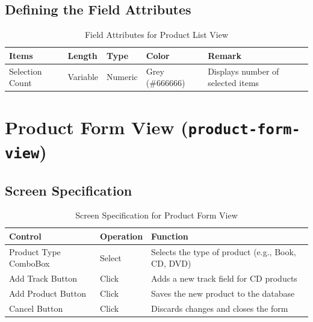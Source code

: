 \documentclass{article}
\begin{document}
\subsection{Defining the Field Attributes}
\begin{table}[h!]
\centering
\begin{tabularx}{\textwidth}{|l|l|l|l|X|}
\hline
\textbf{Items} & \textbf{Length} & \textbf{Type} & \textbf{Color} & \textbf{Remark} \\
\hline
Selection Count & Variable & Numeric & Grey (\#666666) & Displays number of selected items \\
\hline
\end{tabularx}
\caption{Field Attributes for Product List View}
\end{table}

\section{Product Form View (\texttt{product-form-view})}
\subsection{Screen Specification}
\begin{table}[h!]
\centering
\begin{tabularx}{\textwidth}{|l|l|X|}
\hline
\textbf{Control} & \textbf{Operation} & \textbf{Function} \\
\hline
Product Type ComboBox & Select & Selects the type of product (e.g., Book, CD, DVD) \\
\hline
Add Track Button & Click & Adds a new track field for CD products \\
\hline
Add Product Button & Click & Saves the new product to the database \\
\hline
Cancel Button & Click & Discards changes and closes the form \\
\hline
\end{tabularx}
\caption{Screen Specification for Product Form View}
\end{table}
\end{document}
